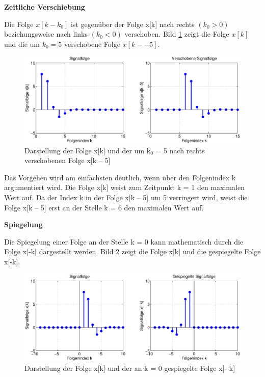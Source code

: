 {\selectfont
\noindent\textbf{Zeitliche Verschiebung}} \smallskip

\noindent Die Folge $x[k - k{}_{0}]$ ist gegen\"{u}ber der Folge x[k] nach rechts $(k{}_{0} \mathrm{>} 0)$ beziehungsweise nach links $(k{}_{0} \mathrm{<} 0)$ verschoben. Bild \ref{fig:VerschibungFolgen} zeigt die Folge $x[k]$ und die um $k{}_{0} = 5$ verschobene Folge $x[k -- 5]$.

\begin{figure}[H]
  \centerline{\includegraphics[width=1\textwidth]{Kapitel3/Bilder/image15.eps}}
  \caption{Darstellung der Folge x[k] und der um k${}_{0}$ = 5 nach rechts verschobenen Folge x[k -- 5]}
  \label{fig:VerschibungFolgen}
\end{figure}

\noindent Das Vorgehen wird am einfachsten deutlich, wenn \"{u}ber den Folgenindex k argumentiert wird. Die Folge x[k] weist zum Zeitpunkt k = 1 den maximalen Wert auf. Da der Index k in der Folge x[k -- 5] um 5 verringert wird, weist die Folge x[k -- 5] erst an der Stelle k = 6 den maximalen Wert auf.\bigskip

{\selectfont
\noindent\textbf{Spiegelung}} \smallskip

\noindent Die Spiegelung einer Folge an der Stelle k = 0 kann mathematisch durch die Folge x[-k] dargestellt werden. Bild \ref{fig:SpiegelungFolgen} zeigt die Folge x[k] und die gespiegelte Folge x[-k].

\begin{figure}[H]
  \centerline{\includegraphics[width=1\textwidth]{Kapitel3/Bilder/image16.eps}}
  \caption{Darstellung der Folge x[k] und der an k = 0 gespiegelte Folge x[- k]}
  \label{fig:SpiegelungFolgen}
\end{figure}

